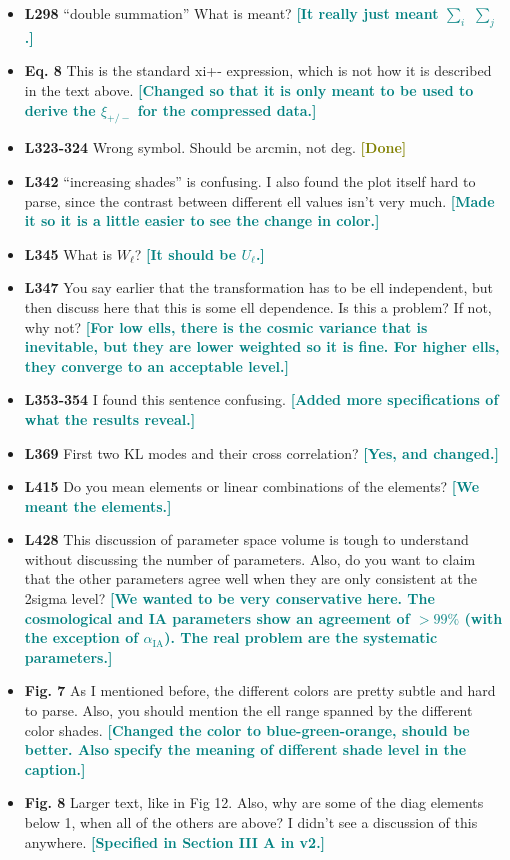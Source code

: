 \documentclass{article}
\newcommand\reply[1]{{\bf {\textcolor{teal}{[#1]}}}}
\newcommand\done{{\bf {\textcolor{olive}{[Done]}}}}
\begin{document}
\begin{itemize}
		\item \textbf{L298} “double summation” What is meant? \reply{It really just meant $\sum_i$ $\sum_j$.}
		\item \textbf{Eq. 8} This is the standard xi+- expression, which is not how it is described in the text above. \reply{Changed so that it is only meant to be used to derive the $\xi_{+/-}$ for the compressed data.}
		\item \textbf{L323-324} Wrong symbol. Should be arcmin, not deg. \done
		\item \textbf{L342} “increasing shades” is confusing. I also found the plot itself hard to parse, since the contrast between different ell values isn’t very much. \reply{Made it so it is a little easier to see the change in color.}
		\item \textbf{L345} What is $W_\ell$? \reply{It should be $U_\ell$.}
		\item \textbf{L347} You say earlier that the transformation has to be ell independent, but then discuss here that this is some ell dependence. Is this a problem? If not, why not? \reply{For low ells, there is the cosmic variance that is inevitable, but they are lower weighted so it is fine. For higher ells, they converge to an acceptable level.}
		\item\textbf{ L353-354} I found this sentence confusing. \reply{Added more specifications of what the results reveal.}
		\item \textbf{L369} First two KL modes and their cross correlation? \reply{Yes, and changed.}
		\item \textbf{L415} Do you mean elements or linear combinations of the elements? \reply{We meant the elements.}
		\item \textbf{L428} This discussion of parameter space volume is tough to understand without discussing the number of parameters.  Also, do you want to claim that the other parameters agree well when they are only consistent at the 2sigma level? \reply{We wanted to be very conservative here. The cosmological and IA parameters show an agreement of $> 99\%$ (with the exception of $\alpha_{\mathrm{IA}}$). The real problem are the systematic parameters.}
		\item \textbf{Fig. 7} As I mentioned before, the different colors are pretty subtle and hard to parse. Also, you should mention the ell range spanned by the different color shades. \reply{Changed the color to blue-green-orange, should be better. Also specify the meaning of different shade level in the caption.}
		\item \textbf{Fig. 8} Larger text, like in Fig 12. Also, why are some of the diag elements below 1, when all of the others are above? I didn’t see a discussion of this anywhere. \reply{Specified in Section III A in v2.}

\end{itemize}
\end{document}
